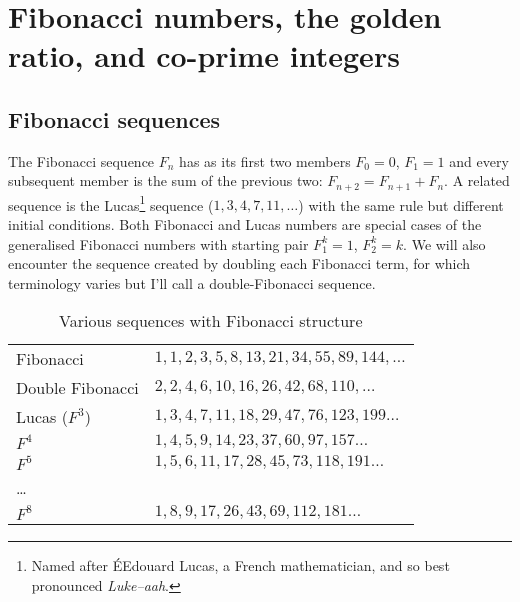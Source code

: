 
\chapter{Fibonacci numbers, the golden ratio, and co-prime integers}

\label{CH:0}
\label{ch:0}
\section{Fibonacci sequences}

The Fibonacci sequence $F_n$ has as its first two members  $F_0=0$, $F_1=1$ and every subsequent member is the sum of the previous two:  $F_{n+2}=F_{n+1}+F_{n}$. 
A related sequence is the Lucas\footnote{Named after ÉEdouard Lucas, a French mathematician, and so best pronounced \textit{Luke--aah}.} sequence  ($1,3,4,7,11,\ldots$) with the same rule but different initial conditions. Both Fibonacci and Lucas numbers are special cases of the generalised Fibonacci numbers with starting pair $F^k_1=1$, $F^k_2=k$. We will also encounter the sequence created by doubling each Fibonacci term, for which terminology varies but I'll call a double-Fibonacci sequence. 
%
\begin{table}[ht]
	\caption{Various sequences with Fibonacci structure}
	\label{tab:sequences}
	\begin{center}
		\begin{tabular}{ll}
			\hline
			Fibonacci  &  $1,1,2,3,5,8,13,21,34,55,89,144,\ldots$ 
			\\
			Double Fibonacci & $2,2,4,6,10,16,26,42,68,110,\ldots$
			\\
			Lucas ($F^3$)&      $ 1,3,4,7,11,18,29,47,76,123,199\ldots$
			\\
			$F^4$  & $1,4,5,9,14,23,37,60,97,157\ldots$
			\\
			$F^5$ & $1,5,6,11,17,28,45,73,118,191\ldots$
			\\
			\ldots &
			\\
			$F^8$ & $1,8,9,17,26,43,69,112,181\ldots$
			\\
			\hline
		\end{tabular}
	
	\end{center}
\end{table}
%

